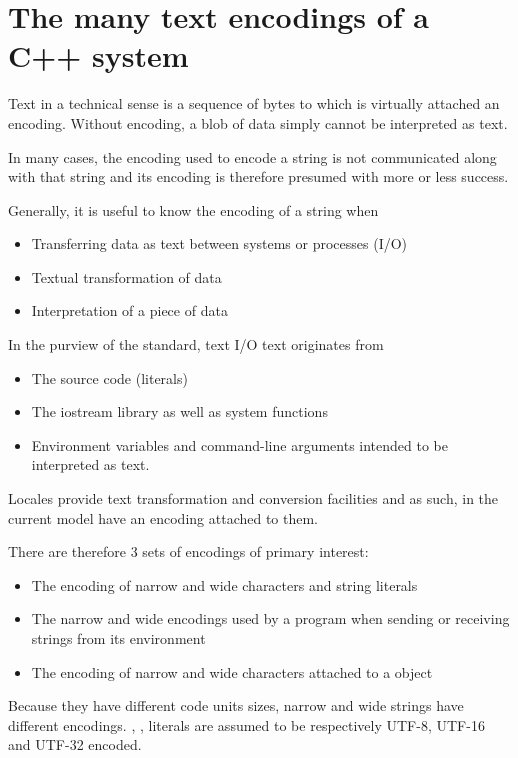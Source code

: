 \documentclass{wg21}
\begin{document}
\section{The many text encodings of a C++ system}

Text in a technical sense is a sequence of bytes to which is virtually attached an encoding.
Without encoding, a blob of data simply cannot be interpreted as text.

In many cases, the encoding used to encode a string is not communicated along with that string and its
encoding is therefore presumed with more or less success.

Generally, it is useful to know the encoding of a string when

\begin{itemize}
    \item Transferring data as text between systems or processes (I/O)
    \item Textual transformation of data
    \item Interpretation of a piece of data
\end{itemize}

In the purview of the standard, text I/O text originates from
\begin{itemize}
    \item The source code (literals)
    \item The iostream library as well as system functions
    \item Environment variables and command-line arguments intended to be interpreted as text.
\end{itemize}

Locales provide text transformation and conversion facilities and as such, in the current model have an encoding attached to them.

There are therefore 3 sets of encodings of primary interest:

\begin{itemize}
    \item The encoding of narrow and wide characters and string literals
    \item The narrow and wide encodings used by a program when sending or receiving strings from its environment
    \item The encoding of narrow and wide characters attached to a  object
\end{itemize}

\note Because they have different code units sizes, narrow and wide strings have different encodings.
, ,  literals are assumed to be respectively UTF-8, UTF-16 and UTF-32 encoded.
\endnote
\end{document}
